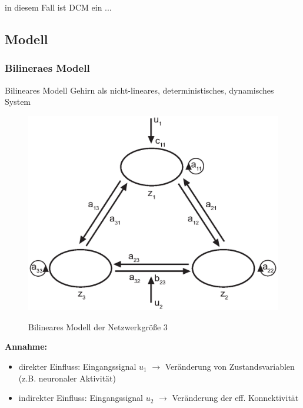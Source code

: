 \documentclass{beamer}
\begin{document}
	\begin{frame}
		in diesem Fall ist DCM ein ...
	\end{frame}
	
\subsection{Modell}
	\subsubsection{Bilineraes Modell}
	\begin{frame}{Bilineares Modell}
		Gehirn als nicht-lineares, deterministisches, dynamisches System 
		\begin{figure}[H]
			\begin{center} \label{fig: bilinearesModell}
				\includegraphics[scale=0.4]{res/bilinearesModell.eps}
				\caption{Bilineares Modell der Netzwerkgröße 3}
			\end{center}
		\end{figure}		
			
		\textbf{Annahme:}
		\begin{itemize}
			\item direkter Einfluss: Eingangssignal $ u_1 $ $ \rightarrow $ Veränderung von Zustandsvariablen (z.B. neuronaler Aktivität)
			\item indirekter Einfluss: Eingangssignal $ u_2 $ $ \rightarrow $ Veränderung der eff. Konnektivität
		\end{itemize}
			
	\end{frame}
\end{document}
